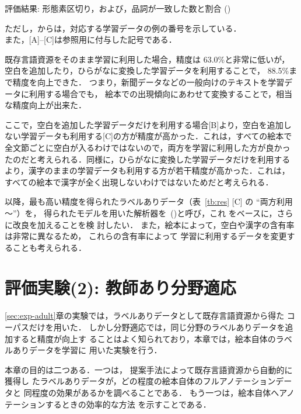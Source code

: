 \documentclass[japanese]{jnlp_1.4}
\newcommand{\kodomo}{}
\newcommand{\kytea}{}
\newcommand{\bestHINOKI}{}
\newcommand{\refs}[1]{}
\begin{document}
\begin{table}[b]
\caption{評価結果: 形態素区切り，および，品詞が一致した数と割合 (\kodomo)}
\label{tb:res}

\vspace{4pt}
\small
ただし，\refs{lxdex-org}から\refs{lxdex-hirasp}は，対応する学習データの例の番号を示している．\\
また，[A]--[C]は参照用に付与した記号である．
\par
\end{table}

既存言語資源をそのまま学習に利用した場合，精度は 63.0\%と非常に低いが，
空白を追加したり，ひらがなに変換した学習データを利用することで，
88.5\%まで精度を向上できた．
つまり，新聞データなどの一般向けのテキストを学習データに利用する場合でも，
絵本での出現傾向にあわせて変換することで，相当な精度向上が出来た．

ここで，空白を追加した学習データだけを利用する場合[B]より，空白を追加し
ない学習データも利用する[C]の方が精度が高かった．これは，すべての絵本で
全文節ごとに空白が入るわけではないので，両方を学習に利用した方が良かっ
たのだと考えられる．同様に，ひらがなに変換した学習データだけを利用する
より，漢字のままの学習データも利用する方が若干精度が高かった．これは，
すべての絵本で漢字が全く出現しないわけではないためだと考えられる．

以降，最も高い精度を得られたラベルありデータ（表~\ref{tb:res} [C] の ``両方利用 \refs{lxdex-org}〜\refs{lxdex-hirasp}''）を\bestHINOKI，
得られたモデルを用いた解析器を\kytea\ (\bestHINOKI)と呼び，これ
をベースに，さらに改良を加えることを検
討したい．
また，絵本によって，空白や漢字の含有率は非常に異なるため，
これらの含有率によって
学習に利用するデータを変更することも考えられる．


\section{評価実験(2): 教師あり分野適応}
\label{sec:exp-add-ehon}

\ref{sec:exp-adult}章の実験では，ラベルありデータとして既存言語資源から得た
コーパスだけを用いた．
しかし分野適応では，同じ分野のラベルありデータを追加すると精度が向上す
ることはよく知られており，本章では，絵本自体のラベルありデータを学習に
用いた実験を行う．

本章の目的は二つある．一つは，
提案手法によって既存言語資源から自動的に獲得し
たラベルありデータが，どの程度の絵本自体のフルアノテーションデータと
同程度の効果があるかを調べることである．
もう一つは，絵本自体へアノテーションするときの効率的な方法
を示すことである．
\end{document}
